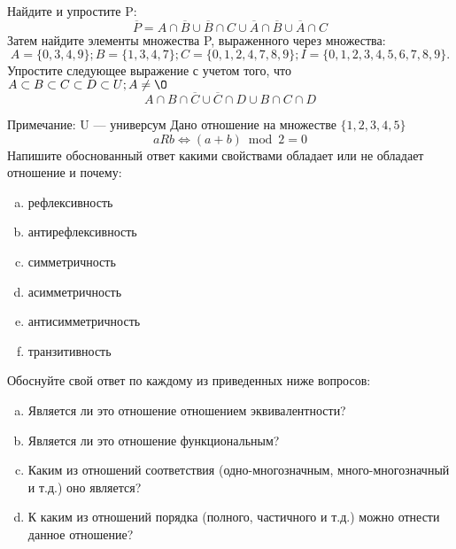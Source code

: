 \documentclass[10pt]{exam}
\begin{document}
\begin{questions}
\question
Найдите и упростите P:
\begin{equation*}
\overline{P} = A \cap \overline{B} \cup \overline{B} \cap C \cup \overline{A} \cap \overline{B} \cup \overline{A} \cap C
\end{equation*}
Затем найдите элементы множества P, выраженного через множества:
\begin{equation*}
A = \{0, 3, 4, 9\}; 
B = \{1, 3, 4, 7\};
C = \{0, 1, 2, 4, 7, 8, 9\};
I = \{0, 1, 2, 3, 4, 5, 6, 7, 8, 9\}.
\end{equation*}\question
Упростите следующее выражение с учетом того, что $A\subset B \subset C \subset D \subset U; A \neq \O$
\begin{equation*}
A \cap B  \cap \overline{C} \cup \overline{C} \cap D \cup B \cap C \cap D
\end{equation*}

Примечание: U — универсум\question
Дано отношение на множестве $\{1, 2, 3, 4, 5\}$ 
\begin{equation*}
aRb \iff (a+b) \bmod 2 =0
\end{equation*}
Напишите обоснованный ответ какими свойствами обладает или не обладает отношение и почему:   
\begin{enumerate} [a)]\setcounter{enumi}{0}
\item рефлексивность
\item антирефлексивность
\item симметричность
\item асимметричность
\item антисимметричность
\item транзитивность
\end{enumerate}

Обоснуйте свой ответ по каждому из приведенных ниже вопросов:
\begin{enumerate} [a)]\setcounter{enumi}{0}
    \item Является ли это отношение отношением эквивалентности?
    \item Является ли это отношение функциональным?
    \item Каким из отношений соответствия (одно-многозначным, много-многозначный и т.д.) оно является?
    \item К каким из отношений порядка (полного, частичного и т.д.) можно отнести данное отношение?
\end{enumerate}




\end{questions}
\end{document}
